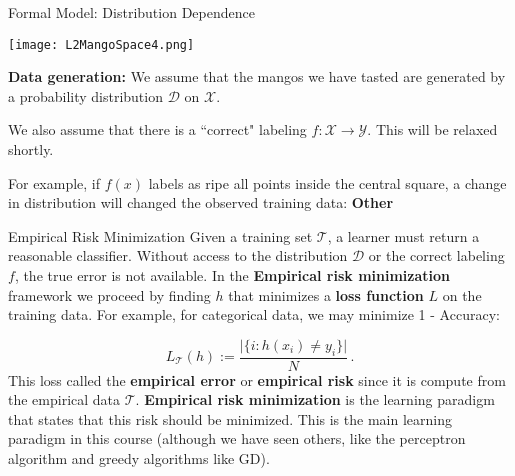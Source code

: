 \documentclass[10pt, table, handout]{beamer}
\begin{document}
\begin{frame}[fragile]{Formal Model: Distribution Dependence}
  \begin{minipage}[t][0.5\textheight][t]{\textwidth}
    \texttt{[image: L2MangoSpace4.png]}
        \centering
  \end{minipage}
  \vfill
  \begin{minipage}[t][0.5\textheight][t]{\textwidth}
\textbf{Data generation:} We assume that the mangos we have tasted are generated by a probability distribution $\mathcal{D}$ on $\mathcal{X}$. 

We also assume that there is a ``correct" labeling $f:\mathcal{X}\to\mathcal{Y}$. This will be relaxed shortly.

For example, if $f(x)$ labels as ripe all points inside the central square, a change in distribution will changed the observed training data: \textbf{Other}
  \end{minipage}

\end{frame}





\begin{frame}[fragile]{Empirical Risk Minimization}
Given a training set $\mathcal{T}$, a learner must return a reasonable classifier. Without access to the distribution $\mathcal{D}$ or the correct labeling $f$, the true error is not available. In the \textbf{Empirical risk minimization} framework we proceed by finding $h$ that minimizes a \textbf{loss function} $L$ on the training data. For example, for categorical data, we may minimize 1 - Accuracy: 

$$
L_{\mathcal{T}}(h) := \frac{\big| \{i: h(x_i)\neq y_i \} \big|}{N}\,.
$$
\pause
This loss called the \textbf{empirical error} or \textbf{empirical risk} since it is compute from the empirical data $\mathcal{T}$. \textbf{Empirical risk minimization} is the learning paradigm that states that this risk should be minimized. This is the main learning paradigm in this course (although we have seen others, like the perceptron algorithm and greedy algorithms like GD). 

\end{frame}
\end{document}
